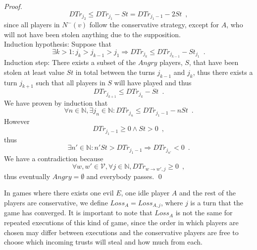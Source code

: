 \documentclass[11pt]{llncs}
\begin{document}
\begin{proof}
       \begin{equation}
          DTr_{j_2} \leq DTr_{j_1} - St = DTr_{j_1-1} - 2St \enspace,
       \end{equation}
       since all players in $N^{-}(v)$ follow the conservative strategy, except for $A$, who will not have been stolen
       anything due to the supposition. \\
       Induction hypothesis: Suppose that
       \begin{equation}
          \exists k > 1 : j_k > j_{k-1} > j_1 \Rightarrow DTr_{j_k} \leq DTr_{j_{k-1}} - St_{j_1} \enspace.
       \end{equation}
       Induction step: There exists a subset of the $Angry$ players, $S$, that have been stolen at least value $St$ in total
       between the turns $j_{k-1}$ and $j_k$, thus there exists a turn $j_{k+1}$ such that all players in $S$ will have
       played and thus
       \begin{equation}
          DTr_{j_{k+1}} \leq DTr_{j_k} - St \enspace.
       \end{equation}
       We have proven by induction that
       \begin{equation}
          \forall n \in \mathbb{N}, \exists j_n \in \mathbb{N} : DTr_{j_n} \leq DTr_{j_1-1} - nSt \enspace.
       \end{equation}
       However
       \begin{equation}
          DTr_{j_1-1} \geq 0 \wedge St > 0 \enspace,
       \end{equation}
       thus
       \begin{equation}
          \exists n' \in \mathbb{N} : n'St > DTr_{j_1-1} \Rightarrow DTr_{j_{n'}} < 0 \enspace.
       \end{equation}
       We have a contradiction because
       \begin{equation}
          \forall w,w' \in \mathcal{V}, \forall j \in \mathbb{N}, DTr_{w \rightarrow w', j} \geq 0 \enspace,
       \end{equation}
       thus eventually $Angry = \emptyset$ and everybody passes. \qed
    \end{proof}
    In games where there exists one evil $E$, one idle player $A$ and the rest of the players are conservative, we define
    $Loss_A = Loss_{A, j}$, where $j$ is a turn that the game has converged. It is important to note that $Loss_A$ is not
    the same for repeated executions of this kind of game, since the order in which players are chosen may differ between
    executions and the conservative players are free to choose which incoming trusts will steal and how much from each.
\end{document}
